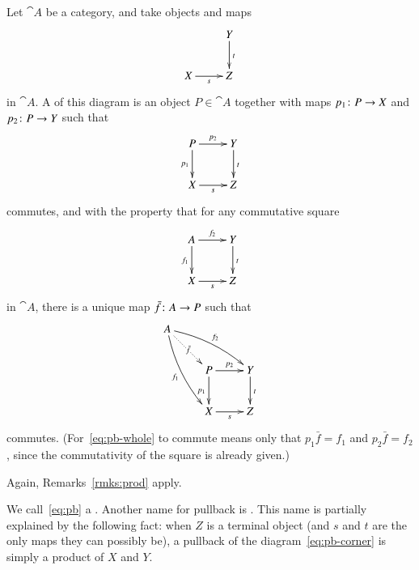 \begin{defn}
\label{defn:pb}
Let $\cat{A}$ be a category, and take objects and maps
%
\begin{equation}
\label{eq:pb-corner}
\begin{array}{c}
\xymatrix{
                &Y \ar[d]^t     \\
X \ar[r]_s      &Z
}
\end{array}
\end{equation}
%
in $\cat{A}$.  A %
%
%
of this diagram is an object $P \in \cat{A}$ together with maps $p_1\from P
\to X$ and $p_2\from P \to Y$ such that
%
\begin{equation}
\label{eq:pb}
\begin{array}{c}
\xymatrix{
P \ar[r]^{p_2} \ar[d]_{p_1}     &
Y \ar[d]^t      \\
X \ar[r]_s      &
Z
}
\end{array}
\end{equation}
%
commutes, and with the property that for any commutative square
%
\begin{equation}
\label{eq:pb-cone}
\begin{array}{c}
\xymatrix{
A \ar[r]^{f_2} \ar[d]_{f_1}     &
Y \ar[d]^t      \\
X \ar[r]_s      &
Z
}
\end{array}
\end{equation}
%
in $\cat{A}$, there is a unique map $\bar{f}\from A \to P$ such that
%
\begin{equation}
\label{eq:pb-whole}
\begin{array}{c}
\xymatrix{
A \ar@/^/[rrd]^{f_2} \ar@{.>}[rd]|{\bar{f}} \ar@/_/[rdd]_{f_1}&
        &       \\
        &
P \ar[r]^{p_2} \ar[d]_{p_1}     &
Y \ar[d]^t      \\
        &
X \ar[r]_s      &Z
}
\end{array}
\end{equation}
%
commutes.  (For~\eqref{eq:pb-whole} to commute means only that $p_1 \bar{f}
= f_1$ and $p_2 \bar{f} = f_2$, since the commutativity of the square is
already given.)
\end{defn}

Again, Remarks~\ref{rmks:prod} apply.

We call~\eqref{eq:pb} a .  Another name for pullback is .  This name is partially explained by the following fact: when $Z$
is a terminal object (and $s$ and $t$ are the only maps they can possibly
be), a pullback of the diagram~\eqref{eq:pb-corner} is simply a product%
%
%
of $X$ and $Y$.

